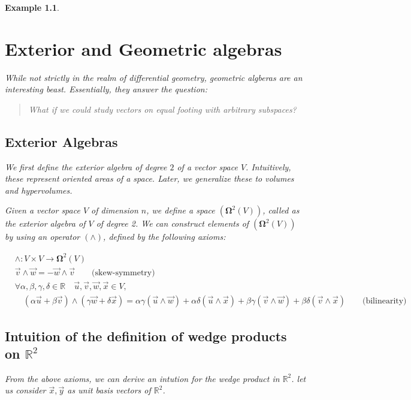 \documentclass[11pt]{book}
\newcommand{\R}{\ensuremath{\mathbb R}}
\newtheorem{example}[theorem]{Example}
\begin{document}
\begin{example}
\chapter{Exterior and Geometric algebras}

While not strictly in the realm of differential geometry, geometric algberas
are an interesting beast. Essentially, they answer the question:

\begin{quote}
    What if we could study vectors on equal footing with arbitrary subspaces?
\end{quote}

\section{Exterior Algebras}
We first define the \emph{exterior algebra of degree $2$} of a vector space $V$.
Intuitively, these represent \emph{oriented areas} of a space. Later,
we generalize these to volumes and hypervolumes.

Given a vector space $V$ of dimension $n$, we define a space $(\mathbf \Omega^2(V))$, called
as the exterior algebra of $V$ of degree 2. We can construct 
elements of $(\mathbf \Omega^2(V))$
by using an operator $(\wedge)$, defined by the following axioms:

\begin{align*}
    &\wedge: V \times V \rightarrow \mathbf \Omega^2(V) \\
    &\vec v \wedge \vec w  = -\vec w \wedge \vec v \qquad \text{(skew-symmetry)}\\
    &\forall \alpha, \beta, \gamma, \delta \in \R \quad \vec u, \vec v,\vec w, \vec x \in V, \\
    &\quad (\alpha \vec u + \beta \vec v) \wedge (\gamma \vec w + \delta \vec x) = 
        \alpha \gamma (\vec u \wedge \vec w) + 
        \alpha \delta (\vec u \wedge \vec x) + 
        \beta \gamma  (\vec v \wedge \vec w) +
         \beta \delta  (\vec v \wedge \vec x) \qquad \text{(bilinearity)}
\end{align*}

\section{Intuition of the definition of wedge products on $\R^2$}

From the above axioms, we can derive an intution for the wedge product in
$\mathbb R^2$. let us consider $\vec x, \vec y$ as unit basis vectors of $\R^2$.


\end{example}
\end{document}
